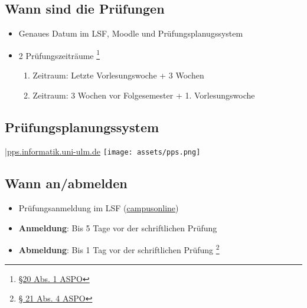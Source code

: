 \documentclass[
	aspectratio=169, 
	8pt 
]{beamer}
\begin{document}
\subsection{Wann sind die Prüfungen}
\begin{frame}{\insertsubsection}
    \begin{itemize}
        \item Genaues Datum im LSF, Moodle und Prüfungsplanugssystem
        \item 2 Prüfungszeiträume \footnote{\href{https://www.uni-ulm.de/fileadmin/website_uni_ulm/zuv/zuv.dezIII.abt2u3/3-2oeffentlich/bekanntmachungen/2022/veroeffentlichung_asop_final.pdf}{§20 Abs. 1 ASPO}} \begin{enumerate} 
            \item Zeitraum: Letzte Vorlesungswoche + 3 Wochen
            \item Zeitraum: 3 Wochen vor Folgesemester + 1. Vorlesungswoche
        \end{enumerate}
    \end{itemize}
    
\end{frame}

\subsection{Prüfungsplanungssystem}
\begin{frame}{\insertsubsection \space|\space \underline{\href{https://pps.informatik.uni-ulm.de/index.php}{pps.informatik.uni-ulm.de}}}
    \texttt{[image: assets/pps.png]}
\end{frame}


\subsection{Wann an/abmelden}
\begin{frame}{\insertsubsection}
    \begin{itemize}
        \item Prüfungsanmeldung im LSF (\underline{\href{https://campusonline.uni-ulm.de}{campusonline}})
        \item \textbf{Anmeldung}: Bis 5 Tage vor der schriftlichen Prüfung
        \item \textbf{Abmeldung}: Bis 1 Tag vor der schriftlichen Prüfung \footnote{\href{https://www.uni-ulm.de/fileadmin/website_uni_ulm/zuv/zuv.dezIII.abt2u3/3-2oeffentlich/bekanntmachungen/2022/veroeffentlichung_asop_final.pdf}{§ 21 Abs. 4 ASPO}}
    \end{itemize}
\end{frame}
\end{document}
